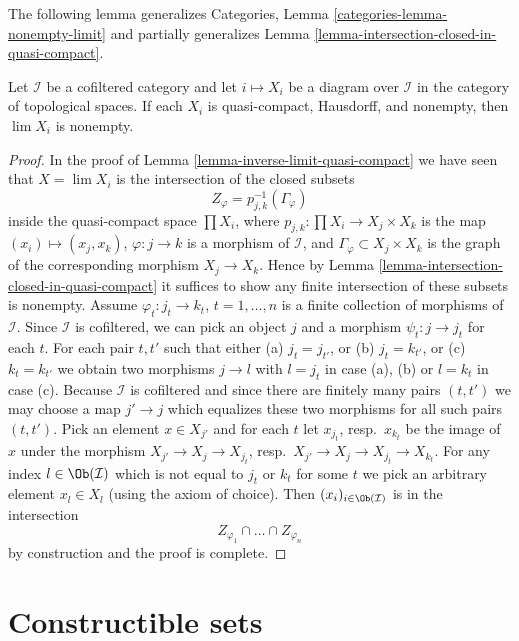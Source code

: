 \noindent
The following lemma generalizes
Categories, Lemma \ref{categories-lemma-nonempty-limit}
and partially generalizes
Lemma \ref{lemma-intersection-closed-in-quasi-compact}.

\begin{lemma}
\label{lemma-nonempty-limit}
Let $\mathcal{I}$ be a cofiltered category and let $i \mapsto X_i$
be a diagram over $\mathcal{I}$ in the category of topological
spaces. If each $X_i$ is quasi-compact, Hausdorff, and nonempty, then
$\lim X_i$ is nonempty.
\end{lemma}

\begin{proof}
In the proof of Lemma \ref{lemma-inverse-limit-quasi-compact}
we have seen that $X = \lim X_i$ is the intersection of the
closed subsets
$$
Z_\varphi = p_{j,k}^{-1}(\Gamma_\varphi)
$$
inside the quasi-compact space $\prod X_i$, where
$p_{j,k} : \prod X_i \to X_j \times X_k$ is the map
$(x_i) \mapsto (x_j, x_k)$, $\varphi : j \to k$ is a morphism of
$\mathcal{I}$, and $\Gamma_\varphi \subset X_j \times X_k$ is the graph
of the corresponding morphism $X_j \to X_k$. Hence by
Lemma \ref{lemma-intersection-closed-in-quasi-compact}
it suffices to show any finite intersection of these subsets is nonempty.
Assume $\varphi_t : j_t \to k_t$, $t = 1, \ldots, n$ is a finite collection
of morphisms of $\mathcal{I}$. Since $\mathcal{I}$ is cofiltered, we can
pick an object $j$ and a morphism $\psi_t : j \to j_t$ for each $t$.
For each pair $t, t'$ such that either (a) $j_t = j_{t'}$, or
(b) $j_t = k_{t'}$, or (c) $k_t = k_{t'}$ we obtain two morphisms
$j \to l$ with $l = j_t$ in case (a), (b) or $l = k_t$ in case (c).
Because $\mathcal{I}$ is cofiltered and since there are finitely
many pairs $(t, t')$ we may choose a map $j' \to j$ which equalizes
these two morphisms for all such pairs $(t, t')$. Pick an element
$x \in X_{j'}$ and for each $t$ let $x_{j_t}$, resp.\ $x_{k_t}$
be the image of $x$ under the morphism $X_{j'} \to X_j \to X_{j_t}$,
resp.\ $X_{j'} \to X_j \to X_{j_t} \to X_{k_t}$.
For any index $l \in \Ob(\mathcal{I})$ which is not equal to
$j_t$ or $k_t$ for some $t$ we pick an arbitrary element $x_l \in X_l$
(using the axiom of choice). Then $(x_i)_{i \in \Ob(\mathcal{I})}$
is in the intersection 
$$
Z_{\varphi_1} \cap \ldots \cap Z_{\varphi_n}
$$
by construction and the proof is complete.
\end{proof}



\section{Constructible sets}
\label{section-constructible}

